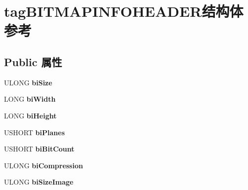 \hypertarget{structtag_b_i_t_m_a_p_i_n_f_o_h_e_a_d_e_r}{}\section{tag\+B\+I\+T\+M\+A\+P\+I\+N\+F\+O\+H\+E\+A\+D\+E\+R结构体 参考}
\label{structtag_b_i_t_m_a_p_i_n_f_o_h_e_a_d_e_r}
\subsection*{Public 属性}
\begin{DoxyCompactItemize}
\item 
\mbox{\label{structtag_b_i_t_m_a_p_i_n_f_o_h_e_a_d_e_r_a154acda62556b6841eaf65d27681fa51}} 
U\+L\+O\+NG {\bfseries bi\+Size}
\item 
\mbox{\label{structtag_b_i_t_m_a_p_i_n_f_o_h_e_a_d_e_r_a4bbc605184be98c4da36f707f7695e0f}} 
L\+O\+NG {\bfseries bi\+Width}
\item 
\mbox{\label{structtag_b_i_t_m_a_p_i_n_f_o_h_e_a_d_e_r_aa18cf290b7f7a6d1cc8058feae85ab68}} 
L\+O\+NG {\bfseries bi\+Height}
\item 
\mbox{\label{structtag_b_i_t_m_a_p_i_n_f_o_h_e_a_d_e_r_a30266e75caa88af4d076f28765b3d5b2}} 
U\+S\+H\+O\+RT {\bfseries bi\+Planes}
\item 
\mbox{\label{structtag_b_i_t_m_a_p_i_n_f_o_h_e_a_d_e_r_a83d8ec1c938ec38b954be6bc07b7f202}} 
U\+S\+H\+O\+RT {\bfseries bi\+Bit\+Count}
\item 
\mbox{\label{structtag_b_i_t_m_a_p_i_n_f_o_h_e_a_d_e_r_ac752c258b9a19a1616270439d5f06d7c}} 
U\+L\+O\+NG {\bfseries bi\+Compression}
\item 
\mbox{\label{structtag_b_i_t_m_a_p_i_n_f_o_h_e_a_d_e_r_a3e02dcda1242e91f66e51253b8977876}} 
U\+L\+O\+NG {\bfseries bi\+Size\+Image}
\item 

\end{DoxyCompactItemize}
